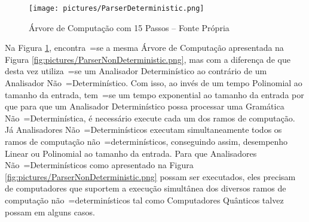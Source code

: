 {    
    \begin{figure}[H]
    \centering
    \texttt{[image: pictures/ParserDeterministic.png]}
    \caption{Árvore de Computação com 15 Passos -- Fonte Própria}
    \label{fig:pictures/ParserDeterministic.png}
    \end{figure}

    Na Figura \ref{fig:pictures/ParserDeterministic.png},
    encontra~=se a mesma Árvore de Computação apresentada na
    Figura \ref{fig:pictures/ParserNonDeterministic.png},
    mas com a diferença de que desta vez utiliza~=se um Analisador
    Determinístico ao contrário de um Analisador Não~=Determinístico.
    Com isso,
    ao invés de um tempo Polinomial ao tamanho da entrada,
    tem~=se um tempo exponential ao tamanho da entrada por que para que um
    Analisador Determinístico possa processar uma Gramática Não~=Determinística,
    é necessário execute cada um dos ramos de computação.
    Já Analisadores Não~=Determinísticos executam simultaneamente
    todos os ramos de computação não~=determinísticos,
    conseguindo assim,
    desempenho Linear ou Polinomial ao tamanho da entrada.
    Para que Analisadores Não~=Determinísticos como apresentado na Figura
    \ref{fig:pictures/ParserNonDeterministic.png} possam ser executados,
    eles precisam de computadores que suportem a execução simultânea dos
    diversos ramos de computação não~=determinísticos tal como
    Computadores Quânticos talvez possam em alguns casos.
}

